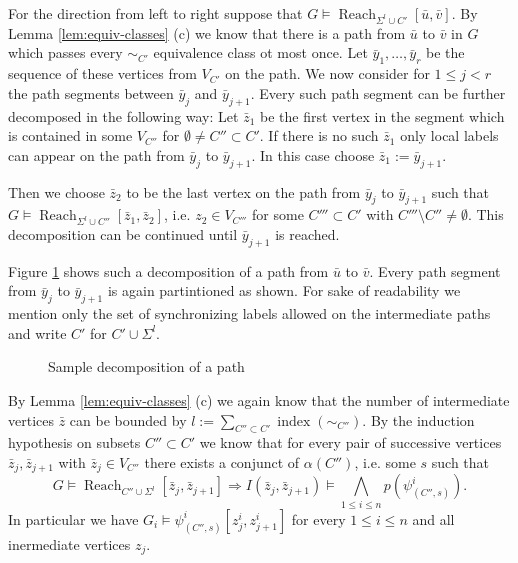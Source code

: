 \documentclass{LMCS}
\DeclareMathOperator{\Reach}{Reach}
\DeclareMathOperator{\ind}{index}
\begin{document}
For the direction from left to right suppose that $G \models \Reach_{\Sigma^l \cup C'}[\bar u, \bar v].$
By Lemma \ref{lem:equiv-classes} (c) we know that there is a path from $\bar u$ to $\bar v$ in $G$ which
passes every $\sim_{C'}$ equivalence class ot most once. Let $\bar y_1, \ldots, \bar y_r$ be the
sequence of these vertices from $V_{C'}$ on the path. We now consider for $1 \le j < r$ the path segments
between $\bar y_j$ and $\bar y_{j+1}$. Every such path segment can be further decomposed in  the following 
way: Let $\bar z_1$ be the first vertex in the segment which is contained in some $V_{C''}$ for $\emptyset \neq C'' 
\subset C'$. If there is no such $\bar z_1$ only local labels can appear on the path from $\bar y_j$ to 
$\bar y_{j+1}$. In this case choose $\bar z_1:= \bar y_{j+1}$. 

Then we choose $\bar z_2$ to be the last vertex
on the path from $\bar y_j$ to $\bar y_{j+1}$ such that $G \models \Reach_{\Sigma^l \cup C''}[\bar z_1, \bar z_2]$,
i.e. $z_2 \in V_{C'''}$ for some $C''' \subset C'$ with $C''' \setminus C'' \neq \emptyset$.
This decomposition can be continued until $\bar y_{j+1}$ is reached. 

Figure \ref{fig:path-decomp} shows such a decomposition of a path from $\bar u$ to $\bar v$.
Every path segment from $\bar y_j$ to $\bar y_{j+1}$ is again partintioned as shown. For
sake of readability we mention only the set of synchronizing labels allowed on the intermediate 
paths and write $C'$ for $C' \cup \Sigma^l$.

\begin{figure}[htbp]
  \centering
  \caption{Sample decomposition of a path}
  \label{fig:path-decomp}
\end{figure}



By Lemma \ref{lem:equiv-classes} (c)
we again know that the number of intermediate vertices $\bar z$ can be bounded by 
$l:=\sum_{C'' \subset C'} \ind(\sim_{C''})$. By the induction hypothesis on subsets $C'' \subset C'$ 
we know that for every pair of successive vertices $\bar z_j, \bar z_{j+1}$ with $\bar z_j \in V_{C''}$
there exists a conjunct of $\alpha(C'')$, i.e. some $s$ such that
\[ G \models \Reach_{C'' \cup \Sigma^l}[\bar z_j, \bar z_{j+1}] \Rightarrow 
   I(\bar z_j, \bar z_{j+1}) \models \bigwedge_{1 \le i \le n} p(\psi^i_{(C'',s)}).\] 
In particular we have $G_i \models \psi^i_{(C'',s)}[z_j^i,z_{j+1}^i]$ for every $1 \le i \le n$
and all inermediate vertices $z_j$. 
\end{document}
